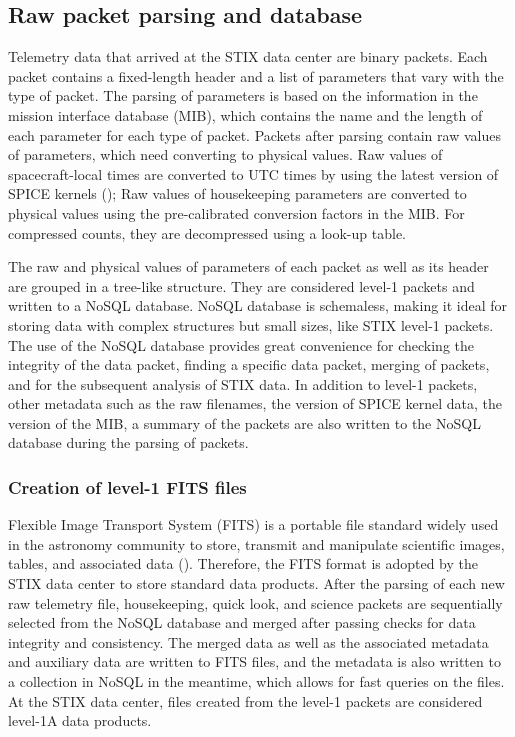\documentclass[referee]{aa} %
\begin{document}
\subsection{Raw packet parsing and database}
Telemetry data that arrived at the STIX data center are binary packets. 
Each packet contains a fixed-length header 
and a list of parameters that vary with the type of packet. 
The parsing of parameters is based on the information in 
the mission interface database (MIB), which contains the name and the 
length of each parameter for each type of packet. 
Packets after parsing contain raw values of parameters, 
which need converting to physical values. 
Raw values of spacecraft-local times are converted to UTC times by using 
the latest version of SPICE kernels (\cite{spice1996,spice2018});
Raw values of housekeeping parameters are converted to physical values using 
the pre-calibrated conversion factors in the MIB. For compressed counts, 
they are decompressed using a look-up table. 

The raw and physical values of parameters of each packet as well as its header are grouped  
in a tree-like structure.  They are considered level-1 packets and written to a NoSQL database. 
NoSQL database is schemaless,  making it ideal for storing data with complex
structures but small sizes, like STIX level-1 packets.  
The use of the NoSQL database provides great convenience for checking the integrity of the data packet,
finding a specific data packet, merging of packets, and for the subsequent analysis of STIX data.  
In addition to level-1 packets, 
other metadata such as the raw filenames,  the version of SPICE kernel data, the version of the MIB,
a  summary of the packets are 
also written to the NoSQL database during the parsing of packets. 

\subsubsection{Creation of level-1 FITS files}
Flexible Image Transport System (FITS) is a portable file standard widely used in the astronomy 
community to store, transmit and manipulate scientific images, tables, and associated data (\cite{fits}).  
Therefore, the FITS format is adopted by the STIX data center to store standard data products. 
After the parsing of each new raw telemetry file, housekeeping, quick look, and science packets  
are sequentially selected from the NoSQL database and merged after passing checks for data integrity and consistency. 
The merged data as well as the associated metadata and auxiliary data are written to FITS files, and 
the metadata is also written to a collection in NoSQL in the meantime, which allows for fast queries on the files.
At the STIX data center, files created from the level-1 packets are considered level-1A data products. 
\end{document}
